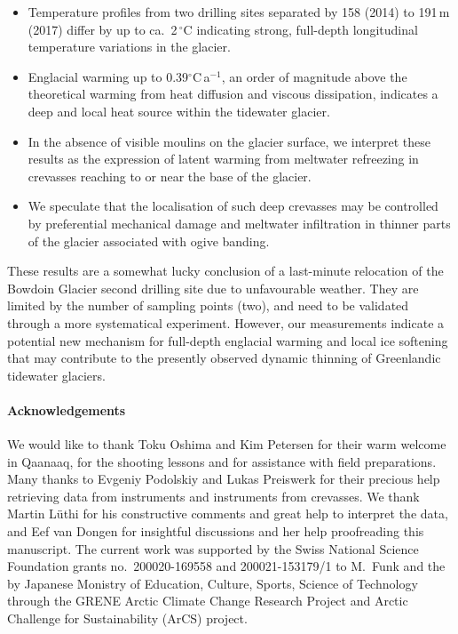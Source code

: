 \documentclass[utf8]{article}
\begin{document}
    \begin{itemize}

      \item Temperature profiles from two drilling sites separated by 158
        (2014) to 191\,m (2017) differ by up to ca.~2\,$^\circ$C indicating
        strong, full-depth longitudinal temperature variations in the glacier.

      \item Englacial warming up to 0.39$^\circ$C\,a$^{-1}$, an order of
        magnitude above the theoretical warming from heat diffusion and viscous
        dissipation, indicates a deep and local heat source within the
        tidewater glacier.

      \item In the absence of visible moulins on the glacier surface, we interpret
        these results as the expression of latent warming from meltwater
        refreezing in crevasses reaching to or near the base of the glacier.

      \item We speculate that the localisation of such deep crevasses may be
        controlled by preferential mechanical damage and meltwater infiltration
        in thinner parts of the glacier associated with ogive banding.

    \end{itemize}

    These results are a somewhat lucky conclusion of a last-minute relocation
    of the Bowdoin Glacier second drilling site due to unfavourable weather.
    They are limited by the number of sampling points (two), and need to
    be validated through a more systematical experiment. However, our
    measurements indicate
    a potential new mechanism for full-depth englacial warming and local
    ice softening that may contribute to the presently observed dynamic
    thinning of Greenlandic tidewater glaciers.



\paragraph{Acknowledgements}

    We would like to thank Toku Oshima and Kim Petersen for their warm welcome
    in Qaanaaq, for the shooting lessons and for assistance with field
    preparations. Many thanks to Evgeniy Podolskiy and Lukas Preiswerk for
    their precious help retrieving data from instruments and instruments from
    crevasses. We thank Martin Lüthi for his constructive comments and great
    help to interpret the data, and Eef van Dongen for insightful discussions
    and her help proofreading this manuscript.
    The current work was supported by the Swiss National Science Foundation
    grants no.~200020-169558 and 200021-153179/1 to M.~Funk and the by Japanese
    Monistry of Education, Culture, Sports, Science of Technology through
    the GRENE Arctic Climate Change Research Project and Arctic Challenge for
    Sustainability (ArCS) project.
\end{document}
